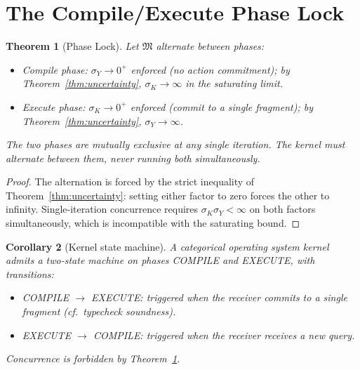 \documentclass[twocolumn,11pt,a4paper]{article}
\newtheorem{theorem}{Theorem}[section]
\newtheorem{corollary}[theorem]{Corollary}
\newcommand{\Method}{\mathfrak{M}}
\newcommand{\disp}{\sigma}
\begin{document}
\section{The Compile/Execute Phase Lock}

\begin{theorem}[Phase Lock]
\label{thm:phase-lock}
Let $\Method$ alternate between phases:
\begin{itemize}[nosep, leftmargin=*]
\item \emph{Compile phase}: $\disp_Y \to 0^{+}$ enforced (no action commitment); by Theorem~\ref{thm:uncertainty}, $\disp_K \to \infty$ in the saturating limit.
\item \emph{Execute phase}: $\disp_K \to 0^{+}$ enforced (commit to a single fragment); by Theorem~\ref{thm:uncertainty}, $\disp_Y \to \infty$.
\end{itemize}
The two phases are mutually exclusive at any single iteration. The kernel must alternate between them, never running both simultaneously.
\end{theorem}

\begin{proof}
The alternation is forced by the strict inequality of Theorem~\ref{thm:uncertainty}: setting either factor to zero forces the other to infinity. Single-iteration concurrence requires $\disp_K \disp_Y < \infty$ on both factors simultaneously, which is incompatible with the saturating bound.
\end{proof}

\begin{corollary}[Kernel state machine]
\label{cor:kernel-state-machine}
A categorical operating system kernel admits a two-state machine on phases COMPILE and EXECUTE, with transitions:
\begin{itemize}[nosep, leftmargin=*]
\item COMPILE $\to$ EXECUTE: triggered when the receiver commits to a single fragment (cf.\ typecheck soundness).
\item EXECUTE $\to$ COMPILE: triggered when the receiver receives a new query.
\end{itemize}
Concurrence is forbidden by Theorem~\ref{thm:phase-lock}.
\end{corollary}
\end{document}
